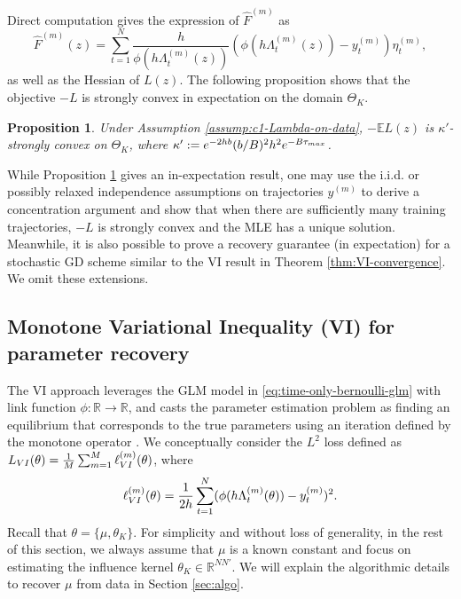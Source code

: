 \documentclass[11pt]{article}
\newtheorem{proposition}[theorem]{Proposition}
\theoremstyle{remark}
\theoremstyle{plain}
\newcommand{\E}{\mathbb{E}}
\newcommand{\R}{\mathbb{R}}
\begin{document}
Direct computation gives the expression of $\hat F^{(m)}$ as 
\begin{equation}\label{eq:expression-hatFm}
\hat F^{(m)}(z) = 
\sum_{t=1}^N  \frac{ h}{ \phi( h  \Lambda_t^{(m)}( z) )}   ( \phi( h  \Lambda_t^{(m)}( z) ) - y_t^{(m)} )  \eta_t^{(m)},
\end{equation}
as well as the Hessian of $L(z)$. The following proposition shows that the objective $-L$ is strongly convex in expectation on the domain $\Theta_K$.

\begin{proposition}\label{prop:GD-strongly-convex}
Under Assumption \ref{assump:c1-Lambda-on-data}, 
$- \E L(z)$ is $\kappa'$-strongly convex on $\Theta_K$,
where $\kappa'  :=  e^{-2hb} (b/B)^2 h^2 e^{-B \tau_{\rm max}}$.
\end{proposition}

While Proposition \ref{prop:GD-strongly-convex} gives an in-expectation result, one may use the i.i.d. or possibly relaxed independence assumptions on trajectories $y^{(m)}$ to derive a concentration argument and show that when there are sufficiently many training trajectories, $-L$ is strongly convex and the MLE has a unique solution. 
%
Meanwhile, it is also possible to prove a recovery guarantee (in expectation) for a stochastic GD scheme similar to the VI result in Theorem \ref{thm:VI-convergence}.
We omit these extensions.







\subsection{Monotone Variational Inequality (VI) for parameter recovery}\label{subsec:VI-recovery-timeonly}


The VI approach leverages the GLM model in \eqref{eq:time-only-bernoulli-glm} with link function $\phi: \R \to \R$, and casts the parameter estimation problem as finding an equilibrium that corresponds to the true parameters using an iteration defined by the monotone operator \cite{juditsky2019signal,juditsky2020convex}.
%
We conceptually consider the $L^2$ loss defined as
 $L_{\rm VI}(\theta)   = \frac{1}{M} \sum_{m=1}^M \ell_{\rm VI}^{(m)}(\theta)$,
 where 
 \[
 \ell_{\rm VI}^{(m)}(\theta)
   = \frac{1}{2 h }\sum_{t=1}^N  ( \phi( h \Lambda_t^{(m)}(\theta)) - y_t^{(m)} )^2.
 \]
Recall that $\theta = \{ \mu, \theta_K\}$.
For simplicity and without loss of generality, in the rest of this section, we always assume that $\mu$ is a known constant and focus on estimating the influence kernel $\theta_K \in \R^{ N N'}$.  We will explain the algorithmic details to recover $\mu$ from data in Section \ref{sec:algo}.
\end{document}
